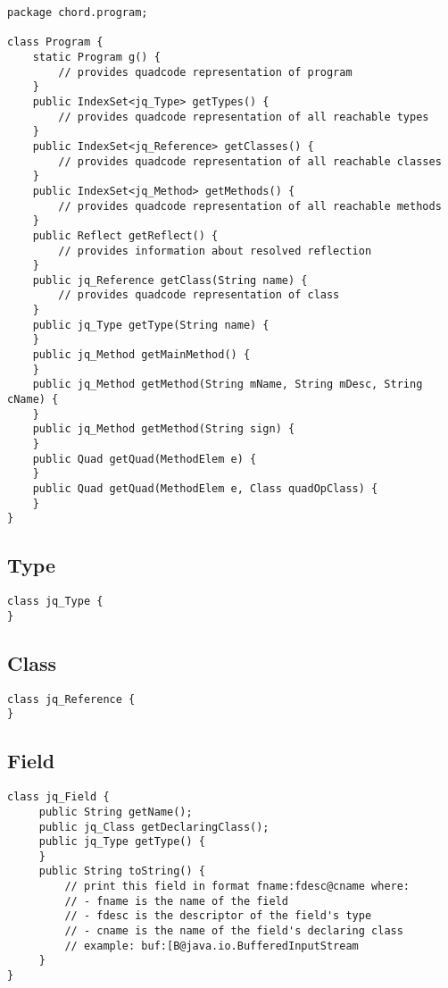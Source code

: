 \begin{framed}
\begin{verbatim}
package chord.program;

class Program {
    static Program g() {
        // provides quadcode representation of program
    }
    public IndexSet<jq_Type> getTypes() {
        // provides quadcode representation of all reachable types
    }
    public IndexSet<jq_Reference> getClasses() {
        // provides quadcode representation of all reachable classes
    }
    public IndexSet<jq_Method> getMethods() {
        // provides quadcode representation of all reachable methods
    }
    public Reflect getReflect() {
        // provides information about resolved reflection
    }
    public jq_Reference getClass(String name) {
        // provides quadcode representation of class 
    }
    public jq_Type getType(String name) {
    }
    public jq_Method getMainMethod() {
    }
    public jq_Method getMethod(String mName, String mDesc, String cName) {
    }
    public jq_Method getMethod(String sign) {
    }
    public Quad getQuad(MethodElem e) {
    }
    public Quad getQuad(MethodElem e, Class quadOpClass) {
    }
}    
\end{verbatim}
\end{framed}

\subsection{Type}

\begin{framed}
\begin{verbatim}
class jq_Type {
}
\end{verbatim}
\end{framed}

\subsection{Class}

\begin{framed}
\begin{verbatim}
class jq_Reference {
}
\end{verbatim}
\end{framed}

\subsection{Field}

\begin{framed}
\begin{verbatim}
class jq_Field {
     public String getName();
     public jq_Class getDeclaringClass();
     public jq_Type getType() {
     }
     public String toString() {
         // print this field in format fname:fdesc@cname where:
         // - fname is the name of the field
         // - fdesc is the descriptor of the field's type
         // - cname is the name of the field's declaring class
         // example: buf:[B@java.io.BufferedInputStream
     }
}
\end{verbatim}
\end{framed}

